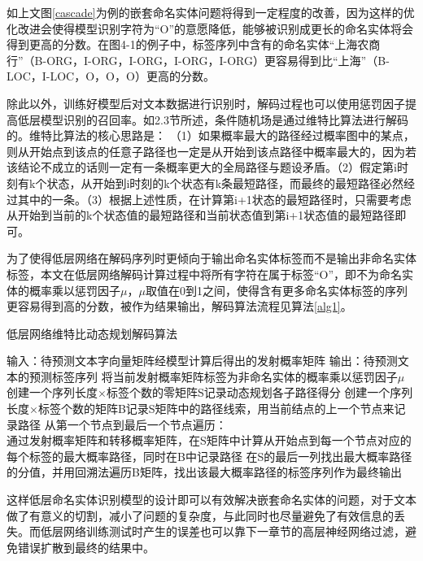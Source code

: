 \documentclass[winfonts,master,oneside,nobackinfo]{njuthesis}
\begin{document}
如上文图\ref{cascade}为例的嵌套命名实体问题将得到一定程度的改善，因为这样的优化改进会使得模型识别字符为“O”的意愿降低，能够被识别成更长的命名实体将会得到更高的分数。在图4-1的例子中，标签序列中含有的命名实体“上海农商行”（B-ORG，I-ORG，I-ORG，I-ORG，I-ORG）更容易得到比“上海”（B-LOC，I-LOC，O，O，O）更高的分数。

除此以外，训练好模型后对文本数据进行识别时，解码过程也可以使用惩罚因子提高低层模型识别的召回率。如2.3节所述，条件随机场是通过维特比算法进行解码的。维特比算法的核心思路是： （1）如果概率最大的路径经过概率图中的某点，则从开始点到该点的任意子路径也一定是从开始到该点路径中概率最大的，因为若该结论不成立的话则一定有一条概率更大的全局路径与题设矛盾。（2）假定第i时刻有k个状态，从开始到i时刻的k个状态有k条最短路径，而最终的最短路径必然经过其中的一条。（3）根据上述性质，在计算第i+1状态的最短路径时，只需要考虑从开始到当前的k个状态值的最短路径和当前状态值到第i+1状态值的最短路径即可。

为了使得低层网络在解码序列时更倾向于输出命名实体标签而不是输出非命名实体标签，本文在低层网络解码计算过程中将所有字符在属于标签“O”，即不为命名实体的概率乘以惩罚因子$\mu$，$\mu$取值在0到1之间，使得含有更多命名实体标签的序列更容易得到高的分数，被作为结果输出，解码算法流程见算法\ref{alg1}。

\begin{algorithm}[h]
    \caption{低层网络维特比动态规划解码算法}
    \label{alg1}
    \begin{algorithmic}[1]
		\STATE 输入：待预测文本字向量矩阵经模型计算后得出的发射概率矩阵
        \STATE 输出：待预测文本的预测标签序列
		\STATE 将当前发射概率矩阵标签为非命名实体的概率乘以惩罚因子$\mu$
        \STATE 创建一个序列长度×标签个数的零矩阵S记录动态规划各子路径得分
        \STATE 创建一个序列长度×标签个数的矩阵B记录S矩阵中的路径线索，用当前结点的上一个节点来记录路径
        \STATE 从第一个节点到最后一个节点遍历： \\
		通过发射概率矩阵和转移概率矩阵，在S矩阵中计算从开始点到每一个节点对应的每个标签的最大概率路径，同时在B中记录路径
		\STATE 在S的最后一列找出最大概率路径的分值，并用回溯法遍历B矩阵，找出该最大概率路径的标签序列作为最终输出
    \end{algorithmic}
\end{algorithm}

这样低层命名实体识别模型的设计即可以有效解决嵌套命名实体的问题，对于文本做了有意义的切割，减小了问题的复杂度，与此同时也尽量避免了有效信息的丢失。而低层网络训练测试时产生的误差也可以靠下一章节的高层神经网络过滤，避免错误扩散到最终的结果中。
\end{document}
